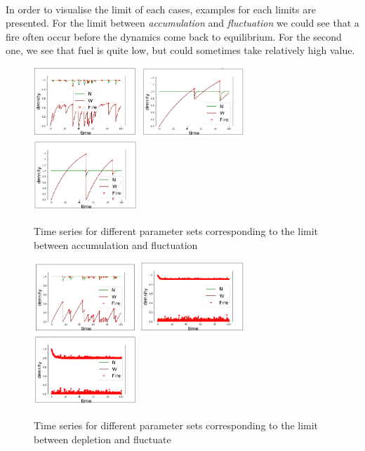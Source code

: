 \documentclass{article}
\begin{document}
\paragraph{}
In order to visualise the limit of each cases, examples for each limits are presented.
For the limit between \textit{accumulation} and \textit{fluctuation} we could see that a fire often occur before the dynamics come back to equilibrium. For the second one, we see that fuel is quite low, but could sometimes take relatively high value.


\begin{figure}[h!]
\centering
\includegraphics[width=3.9cm]{lim_eq_middle_1.png}
\includegraphics[width=3.9cm]{lim_eq_middle_2.png}
\includegraphics[width=3.9cm]{lim_eq_middle_3.png}
\caption{Time series for different parameter sets corresponding to the limit between accumulation and fluctuation}
\end{figure}


\begin{figure}[h!]
\centering
\includegraphics[width=3.9cm]{lim_c_middle_1.png}
\includegraphics[width=3.9cm]{lim_c_middle_2.png}
\includegraphics[width=3.9cm]{lim_c_middle_3.png}
\caption{Time series for different parameter sets corresponding to the limit between depletion and fluctuate}
\end{figure}
\end{document}
